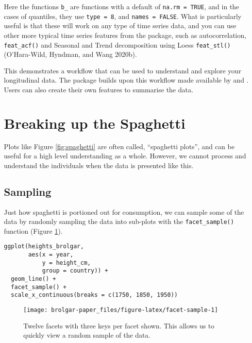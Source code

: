 Here the functions \texttt{b\_} are functions with a default of \texttt{na.rm\ =\ TRUE}, and in
the cases of quantiles, they use \texttt{type\ =\ 8}, and \texttt{names\ =\ FALSE}. What is particularly useful is that these will work on any type of time series data, and you can use other more typical time series features from the  package, such as autocorrelation, \texttt{feat\_acf()} and Seasonal and Trend decomposition using Loess \texttt{feat\_stl()} (O'Hara-Wild, Hyndman, and Wang 2020b).

This demonstrates a workflow that can be used to understand and explore your longitudinal data. The  package builds upon this workflow made available by  and . Users can also create their own features to summarise the data.

\hypertarget{breaking-up-the-spaghetti}{%
\section{Breaking up the Spaghetti}\label{breaking-up-the-spaghetti}}

Plots like Figure \ref{fig:spaghetti} are often called, ``spaghetti plots'', and can be useful for a high level understanding as a whole. However, we cannot process and understand the individuals when the data is presented like this.

\hypertarget{sampling}{%
\subsection{Sampling}\label{sampling}}

Just how spaghetti is portioned out for consumption, we can sample some of the data by randomly sampling the data into sub-plots with the \texttt{facet\_sample()} function (Figure \ref{fig:facet-sample}).

\begin{verbatim}
ggplot(heights_brolgar,
       aes(x = year,
           y = height_cm,
           group = country)) + 
  geom_line() + 
  facet_sample() + 
  scale_x_continuous(breaks = c(1750, 1850, 1950))
\end{verbatim}

\begin{figure}

{\centering \texttt{[image: brolgar-paper\_files/figure-latex/facet-sample-1]} 

}

\caption{Twelve facets with three keys per facet shown. This allows us to quickly view a random sample of the data.}\label{fig:facet-sample}
\end{figure}

